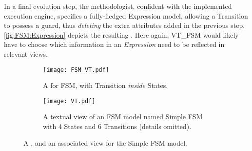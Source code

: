 In a final evolution step, the methodologist, confident with the implemented
execution engine, specifies a fully-fledged \textsf{Expression} model,
allowing a \textsf{Transition} to possess a \textsf{guard}, thus \emph{deleting}
the extra attributes added in the previous step. \cref{fig:FSM:Expression} depicts
the resulting \metamodel. Here again, \textsf{VT\_FSM} would likely have to 
choose which information in an \emph{Expression} need to be reflected in relevant views.

\begin{figure}
    \centering
    \begin{subfigure}[b]{\columnwidth}
			\centering
      \texttt{[image: FSM\_VT.pdf]}
      \caption{A \viewtype for \textsf{FSM}, with \textsf{Transition} \emph{inside} \textsf{State}s.
      }
      \label{fig:VT:VMM}
    \end{subfigure}
    \hfill
    \begin{subfigure}[b]{\columnwidth}
			\centering
      \texttt{[image: VT.pdf]}
      \caption{A textual view of an \textsf{FSM} model named \textsf{Simple FSM} with 4 \textsf{States} and 6 \textsf{Transitions} (details omitted).}
      \label{fig:VT:TM}
    \end{subfigure}
    \caption{A \Viewtype, and an associated view for the \textsf{Simple FSM} model.}
    \label{fig:VT}
\end{figure}
